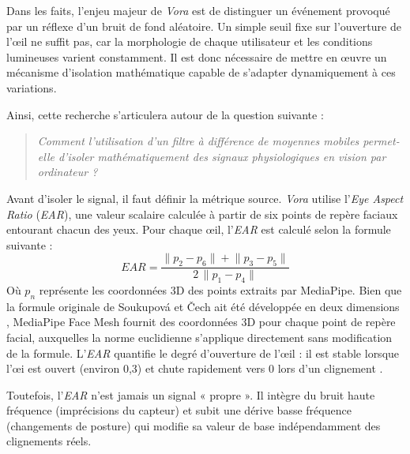 \documentclass{rapportbrebeuf}
\begin{document}
Dans les faits, l'enjeu majeur de \textit{Vora} est de distinguer un événement provoqué par un
réflexe d'un bruit de fond aléatoire. Un simple seuil fixe sur l'ouverture de l'œil ne suffit pas,
car la morphologie de chaque utilisateur et les conditions lumineuses varient constamment. Il est
donc nécessaire de mettre en œuvre un mécanisme d'isolation mathématique capable de s'adapter
dynamiquement à ces variations.

Ainsi, cette recherche s'articulera autour de la question suivante :

\begin{quote}
  \raggedright
  \textit{Comment l'utilisation d'un filtre à différence de moyennes mobiles permet-elle d'isoler
  mathématiquement des signaux physiologiques en vision par ordinateur ?}
\end{quote}

Avant d'isoler le signal, il faut définir la métrique source. \textit{Vora} utilise l'\textit{Eye
Aspect Ratio} (\textit{EAR}), une valeur scalaire calculée à partir de six points de repère faciaux
entourant chacun des yeux. Pour chaque œil, l'\textit{EAR} est calculé selon la formule suivante :
\[
  EAR = \frac{\lVert p_2 - p_6 \rVert + \lVert p_3 - p_5 \rVert}{2\,\lVert p_1 - p_4 \rVert}
\]
Où $p_n$ représente les coordonnées 3D des points extraits par MediaPipe. Bien que la formule originale de Soukupová et Čech ait été développée en deux dimensions \cite{soukupova2016real}, MediaPipe Face Mesh fournit des coordonnées 3D pour chaque point de repère facial, auxquelles la norme euclidienne s'applique directement sans modification de la formule. L'\textit{EAR} quantifie le degré d'ouverture de l'œil : il est stable lorsque l'œi est ouvert (environ 0,3) et chute rapidement vers 0 lors d'un clignement \cite{soukupova2016real}.

Toutefois, l'\textit{EAR} n'est jamais un signal « propre ». Il intègre du bruit haute fréquence (imprécisions du capteur) et subit une dérive basse fréquence (changements de posture) qui modifie sa valeur de base indépendamment des clignements réels.
\end{document}
